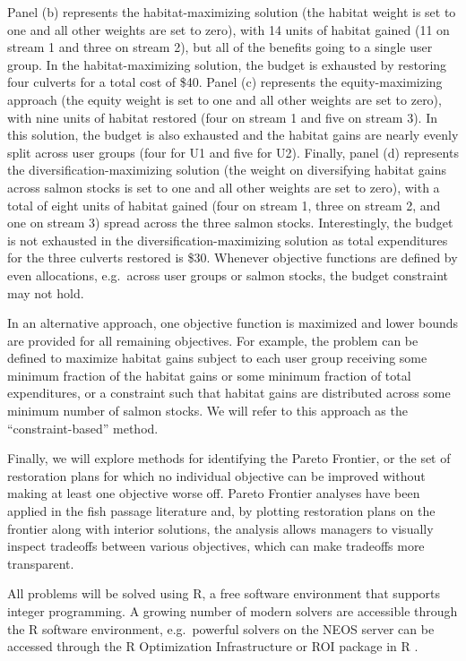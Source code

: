 \documentclass[12pt]{elsarticle}
\begin{document}
Panel (b) represents the habitat-maximizing solution (the habitat weight is set to one and all other weights are set to zero), with 14 units of habitat gained (11 on stream 1 and three on stream 2), but all of the benefits going to a single user group. In the habitat-maximizing solution, the budget is exhausted by restoring four culverts for a total cost of \$40. Panel (c) represents the equity-maximizing approach (the equity weight is set to one and all other weights are set to zero), with nine units of habitat restored (four on stream 1 and five on stream 3). In this solution, the budget is also exhausted and the habitat gains are nearly evenly split across user groups (four for U1 and five for U2). Finally, panel (d) represents the diversification-maximizing solution (the weight on diversifying habitat gains across salmon stocks is set to one and all other weights are set to zero), with a total of eight units of habitat gained (four on stream 1, three on stream 2, and one on stream 3) spread across the three salmon stocks. Interestingly, the budget is not exhausted in the diversification-maximizing solution as total expenditures for the three culverts restored is \$30. Whenever objective functions are defined by even allocations, e.g.\ across user groups or salmon stocks, the budget constraint may not hold. 

In an alternative approach, one objective function is maximized and lower bounds are provided for all remaining objectives. For example, the problem can be defined to maximize habitat gains subject to each user group receiving some minimum fraction of the habitat gains or some minimum fraction of total expenditures, or a constraint such that habitat gains are distributed across some minimum number of salmon stocks. We will refer to this approach as the ``constraint-based'' method.

Finally, we will explore methods for identifying the Pareto Frontier, or the set of restoration plans for which no individual objective can be improved without making at least one objective worse off. Pareto Frontier analyses have been applied in the fish passage literature \citep[e.g.][]{couto_safeguarding_2021} and, by plotting restoration plans on the frontier along with interior solutions, the analysis allows managers to visually inspect tradeoffs between various objectives, which can make tradeoffs more transparent.

All problems will be solved using R, a free software environment that supports integer programming. A growing number of modern solvers are accessible through the R software environment, e.g.\ powerful solvers on the NEOS server can be accessed through the R Optimization Infrastructure or ROI package in R \citep{theussl2019roi}.
\end{document}
